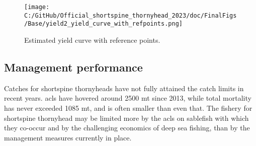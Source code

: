 \documentclass[11pt,
  english,
  letterpaper,
]{article}
\begin{document}
\begin{figure}
\centering
\texttt{[image: C:/GitHub/Official\_shortspine\_thornyhead\_2023/doc/FinalFigs/Base/yield2\_yield\_curve\_with\_refpoints.png]}
\caption{Estimated yield curve with reference points.\label{fig:yieldcurve}}
\end{figure}

\hypertarget{management-performance}{%
\subsection*{Management performance}\label{management-performance}}

Catches for shortspine thornyheads have not fully attained the catch limits in recent years. \Gls{acl}s have hovered around 2500 mt since 2013, while total mortality has never exceeded 1085 mt, and is often smaller than even that. The fishery for shortspine thornyhead may be limited more by the \gls{acl}s on sablefish with which they co-occur and by the challenging economics of deep sea fishing, than by the management measures currently in place. \begingroup\fontsize{10}{12}\selectfont \begingroup\fontsize{10}{12}\selectfont
\end{document}
